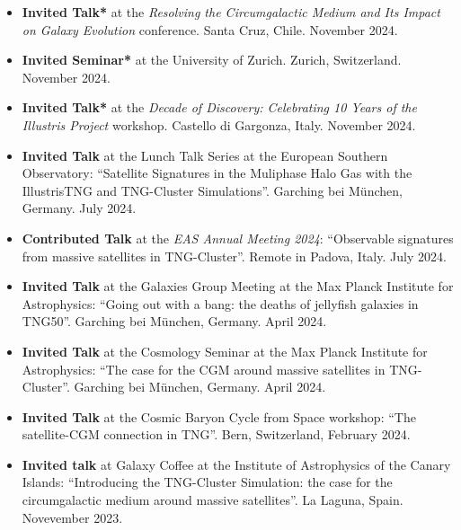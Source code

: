 \documentclass[a4paper,10pt,oneside]{article}
\begin{document}
\begin{itemize}[wide, labelwidth=!, labelindent=-11pt, parsep=0pt]
    \item {\bf Invited Talk*} at the {\it Resolving the Circumgalactic Medium and Its Impact on Galaxy Evolution} conference. Santa Cruz, Chile. November 2024.
    \item {\bf Invited Seminar*} at the University of Zurich. Zurich, Switzerland. November 2024.
    \item {\bf Invited Talk*} at the {\it Decade of Discovery: Celebrating 10 Years of the Illustris Project} workshop. Castello di Gargonza, Italy. November 2024.
    \item {\bf Invited Talk} at the Lunch Talk Series at the European Southern Observatory: ``Satellite Signatures in the Muliphase Halo Gas with the IllustrisTNG and TNG-Cluster Simulations''. Garching bei M{\"u}nchen, Germany. July 2024.
    \item {\bf Contributed Talk} at the {\it EAS Annual Meeting 2024}: ``Observable signatures from massive satellites in TNG-Cluster''. Remote in Padova, Italy. July 2024.
    \item {\bf Invited Talk} at the Galaxies Group Meeting at the Max Planck Institute for Astrophysics: ``Going out with a bang: the deaths of jellyfish galaxies in TNG50''. Garching bei M{\"u}nchen, Germany. April 2024.
    \item {\bf Invited Talk} at the Cosmology Seminar at the Max Planck Institute for Astrophysics: ``The case for the CGM around massive satellites in TNG-Cluster''. Garching bei M{\"u}nchen, Germany. April 2024.
    \item {\bf Invited Talk} at the Cosmic Baryon Cycle from Space workshop: ``The satellite-CGM connection in TNG''. Bern, Switzerland, February 2024.
    \item {\bf Invited talk} at Galaxy Coffee at the Institute of Astrophysics of the Canary Islands: ``Introducing the TNG-Cluster Simulation: the case for the circumgalactic medium around massive satellites''. La Laguna, Spain. Novevember 2023.

\end{itemize}
\end{document}
